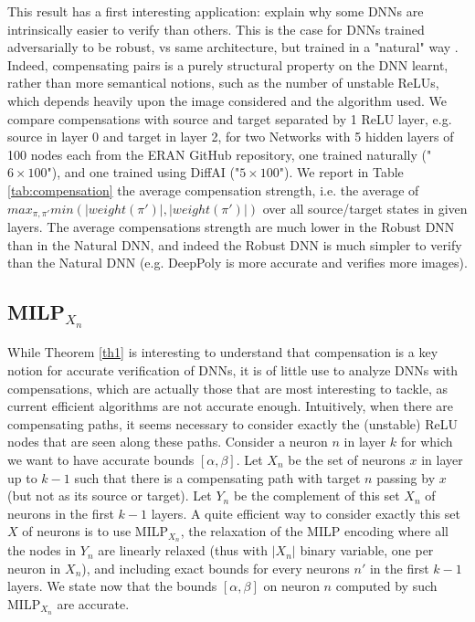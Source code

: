 \documentclass{llncs}
\begin{document}
This result has a first interesting application: explain why some DNNs are intrinsically easier to verify than others. This is the case for DNNs trained adversarially to be robust, vs same architecture, but trained in a "natural" way \cite{deeppoly,prima,crown}. Indeed, compensating pairs is a purely structural property on the DNN learnt, rather than more semantical notions, such as the number of unstable ReLUs, which depends heavily upon the image considered and the algorithm used. We compare compensations with source and target separated by 1 ReLU layer, e.g. source in layer 0 and target in layer 2, for two Networks with 5 hidden layers of 100 nodes each from the ERAN GitHub repository, one trained naturally ("$6\times100$"), 
and one trained using DiffAI ("$5\times100$"). 
We report in Table \ref{tab:compensation} the average compensation strength, i.e. 
the average of $max_{\pi,\pi'} min(|weight(\pi')|,|weight(\pi')|)$
over all source/target states in given layers. The average compensations strength are much lower in the Robust DNN than in the Natural DNN, and indeed the Robust DNN is much simpler to verify than the Natural DNN (e.g. DeepPoly is more accurate and verifies more images).


\subsection{MILP$_{X_n}$}

While Theorem \ref{th1} is interesting to understand that compensation is a key notion for accurate verification of DNNs, it is of little use to analyze DNNs with compensations, which are actually those that are most interesting to tackle, as current efficient algorithms are not accurate enough.
Intuitively, when there are compensating paths, it seems necessary to consider exactly the (unstable) ReLU nodes that are seen along these paths. 
Consider a neuron $n$ in layer $k$ for which we want to have accurate bounds $[\alpha,\beta]$.
Let $X_n$ be the set of neurons $x$ in layer up to $k-1$ such that there is a compensating path with target $n$ passing by $x$ (but not as its source or target). Let $Y_n$ be the complement of this set $X_n$ of neurons in the first $k-1$ layers. A quite efficient way to consider exactly this set $X$ of neurons is to use MILP$_{X_n}$, the relaxation of the MILP encoding where all the nodes in $Y_n$ are linearly relaxed (thus with $|X_n|$ binary variable, one per neuron in $X_n$), and including exact bounds for every neurons $n'$ in the first $k-1$ layers. We state now that the bounds $[\alpha,\beta]$ on neuron $n$ computed by such MILP$_{X_n}$ are accurate.
\end{document}
